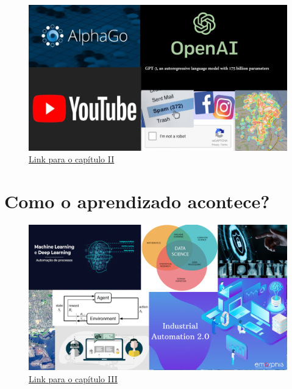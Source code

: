 \documentclass{beamer}
\begin{document}
\begin{frame}

    \begin{figure}[ht]
        \centering
        \includegraphics[scale=0.5]{imagens/Capitulo2.png}
        \caption{\href{run:./LDO-Capitulo2.pdf}{Link para o capítulo II}}
    \end{figure}

\end{frame}

\section{Como o aprendizado acontece?}

\begin{frame}

    \begin{figure}[ht]
        \centering
        \includegraphics[scale=0.5]{imagens/Capitulo3.png}
        \caption{\href{run:./LDO-Capitulo3.pdf}{Link para o capítulo III}}
    \end{figure}

\end{frame}
\end{document}
